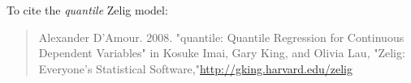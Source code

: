 To cite the \emph{ quantile } Zelig model:
 \begin{verse}
 Alexander D'Amour. 2008. "quantile: Quantile Regression for Continuous Dependent Variables" in Kosuke Imai, Gary King, and Olivia Lau, "Zelig: Everyone's Statistical Software,"\url{http://gking.harvard.edu/zelig} 
\end{verse}